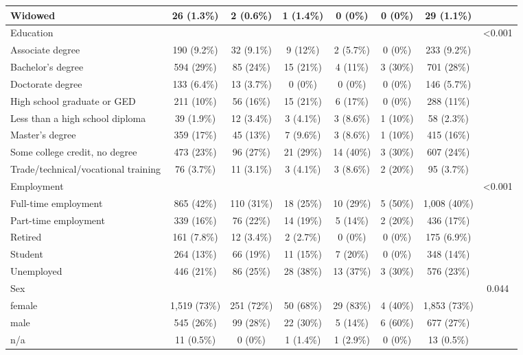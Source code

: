 \begin{tabular}{l|c|c|c|c|c|c|c}
\hline
Widowed & 26 (1.3\%) & 2 (0.6\%) & 1 (1.4\%) & 0 (0\%) & 0 (0\%) & 29 (1.1\%) & \\
\hline
Education &  &  &  &  &  &  & <0.001\\
\hline
Associate degree & 190 (9.2\%) & 32 (9.1\%) & 9 (12\%) & 2 (5.7\%) & 0 (0\%) & 233 (9.2\%) & \\
\hline
Bachelor's degree & 594 (29\%) & 85 (24\%) & 15 (21\%) & 4 (11\%) & 3 (30\%) & 701 (28\%) & \\
\hline
Doctorate degree & 133 (6.4\%) & 13 (3.7\%) & 0 (0\%) & 0 (0\%) & 0 (0\%) & 146 (5.7\%) & \\
\hline
High school graduate or GED & 211 (10\%) & 56 (16\%) & 15 (21\%) & 6 (17\%) & 0 (0\%) & 288 (11\%) & \\
\hline
Less than a high school diploma & 39 (1.9\%) & 12 (3.4\%) & 3 (4.1\%) & 3 (8.6\%) & 1 (10\%) & 58 (2.3\%) & \\
\hline
Master's degree & 359 (17\%) & 45 (13\%) & 7 (9.6\%) & 3 (8.6\%) & 1 (10\%) & 415 (16\%) & \\
\hline
Some college credit, no degree & 473 (23\%) & 96 (27\%) & 21 (29\%) & 14 (40\%) & 3 (30\%) & 607 (24\%) & \\
\hline
Trade/technical/vocational training & 76 (3.7\%) & 11 (3.1\%) & 3 (4.1\%) & 3 (8.6\%) & 2 (20\%) & 95 (3.7\%) & \\
\hline
Employment &  &  &  &  &  &  & <0.001\\
\hline
Full-time employment & 865 (42\%) & 110 (31\%) & 18 (25\%) & 10 (29\%) & 5 (50\%) & 1,008 (40\%) & \\
\hline
Part-time employment & 339 (16\%) & 76 (22\%) & 14 (19\%) & 5 (14\%) & 2 (20\%) & 436 (17\%) & \\
\hline
Retired & 161 (7.8\%) & 12 (3.4\%) & 2 (2.7\%) & 0 (0\%) & 0 (0\%) & 175 (6.9\%) & \\
\hline
Student & 264 (13\%) & 66 (19\%) & 11 (15\%) & 7 (20\%) & 0 (0\%) & 348 (14\%) & \\
\hline
Unemployed & 446 (21\%) & 86 (25\%) & 28 (38\%) & 13 (37\%) & 3 (30\%) & 576 (23\%) & \\
\hline
Sex &  &  &  &  &  &  & 0.044\\
\hline
female & 1,519 (73\%) & 251 (72\%) & 50 (68\%) & 29 (83\%) & 4 (40\%) & 1,853 (73\%) & \\
\hline
male & 545 (26\%) & 99 (28\%) & 22 (30\%) & 5 (14\%) & 6 (60\%) & 677 (27\%) & \\
\hline
n/a & 11 (0.5\%) & 0 (0\%) & 1 (1.4\%) & 1 (2.9\%) & 0 (0\%) & 13 (0.5\%) & \\

\end{tabular}
